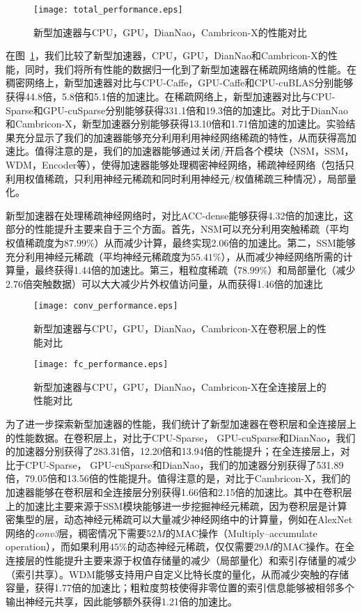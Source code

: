 \begin{figure}[h]
\centering
\texttt{[image: total\_performance.eps]}
\caption{新型加速器与CPU，GPU，DianNao，Cambricon-X的性能对比}
\label{fig:total_performance}
\end{figure}

在图~\ref{fig:total_performance}，我们比较了新型加速器，CPU，GPU，DianNao和Cambricon-X的性能，同时，我们将所有性能的数据归一化到了新型加速器在稀疏网络熵的性能。在稠密网络上，新型加速器对比与CPU-Caffe，GPU-Caffe和CPU-cuBLAS分别能够获得44.8倍，5.8倍和5.1倍的加速比。在稀疏网络上，新型加速器对比与CPU-Sparse和GPU-cuSparse分别能够获得331.1倍和19.3倍的加速比。对比于DianNao和Cambricon-X，新型加速器分别能够获得13.10倍和1.71倍加速的加速比。实验结果充分显示了我们的加速器能够充分利用利用神经网络稀疏的特性，从而获得高加速比。值得注意的是，我们的加速器能够通过关闭/开启各个模块（NSM，SSM，WDM，Encoder等），使得加速器能够处理稠密神经网络，稀疏神经网络（包括只利用权值稀疏，只利用神经元稀疏和同时利用神经元/权值稀疏三种情况），局部量化。

新型加速器在处理稀疏神经网络时，对比ACC-dense能够获得4.32倍的加速比，这部分的性能提升主要来自于三个方面。首先，NSM可以充分利用突触稀疏（平均权值稀疏度为$87.99\%$）从而减少计算，最终实现2.06倍的加速比。第二，SSM能够充分利用神经元稀疏（平均神经元稀疏度为$55.41\%$），从而减少神经网络所需的计算量，最终获得1.44倍的加速比。第三，粗粒度稀疏（$78.99\%$）和局部量化（减少2.76倍突触数据）可以大大减少片外权值访问量，从而获得1.46倍的加速比

\begin{figure}[h]
\centering
\texttt{[image: conv\_performance.eps]}
\caption{新型加速器与CPU，GPU，DianNao，Cambricon-X在卷积层上的性能对比}
\label{fig:conv_performance}
\end{figure}

\begin{figure}[h]
\centering
\texttt{[image: fc\_performance.eps]}
\caption{新型加速器与CPU，GPU，DianNao，Cambricon-X在全连接层上的性能对比}
\label{fig:fc_performance}
\end{figure}

为了进一步探索新型加速器的性能，我们统计了新型加速器在卷积层和全连接层上的性能数据。在卷积层上，对比于CPU-Sparse， GPU-cuSparse和DianNao，我们的加速器分别获得了283.31倍，12.20倍和13.94倍的性能提升；在全连接层上，对比于CPU-Sparse， GPU-cuSparse和DianNao，我们的加速器分别获得了531.89倍，79.05倍和13.56倍的性能提升。值得注意的是，对比于Cambricon-X，我们的加速器能够在卷积层和全连接层分别获得1.66倍和2.15倍的加速比。其中在卷积层上的加速比主要来源于SSM模块能够进一步挖掘神经元稀疏，因为卷积层是计算密集型的层，动态神经元稀疏可以大量减少神经网络中的计算量，例如在AlexNet网络的\emph{conv3}层，稠密情况下需要$52M$的MAC操作（Multiply–accumulate operation），而如果利用$45\%$的动态神经元稀疏，仅仅需要$29M$的MAC操作。在全连接层的性能提升主要来源于权值存储量的减少（局部量化）和索引存储量的减少（索引共享）。WDM能够支持用户自定义比特长度的量化，从而减少突触的存储容量，获得1.77倍的加速比；粗粒度剪枝使得非零位置的索引信息能够被相邻多个输出神经元共享，因此能够额外获得1.21倍的加速比。


